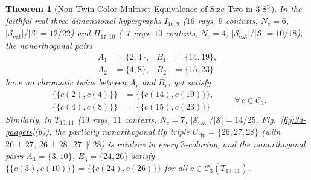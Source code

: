 \documentclass[aps,pra,reprint,superscriptaddress,longbibliography,nofootinbib,floatfix,10pt]{revtex4-2}
\newtheorem{theorem}{Theorem}
\theoremstyle{definition}\newtheorem{definition}[theorem]{Definition}
\theoremstyle{remark}\newtheorem{remark}[theorem]{Remark}
\newcommand{\Sc}{\mathcal S}\newcommand{\Cc}{\mathcal C}\newcommand{\Wc}{\mathcal W}
\begin{document}
\begin{theorem}[Non-Twin Color-Multiset Equivalence of Size Two in $3.8^3$]\label{thm:size2-real}
In the faithful real three-dimensional hypergraphs $I_{16,9}$ ($16$ rays, $9$ contexts, $N_c=6$, $|\Sc_{\mathrm{ext}}|/|\Sc|=12/22$) and $H_{17,10}$ ($17$ rays, $10$ contexts, $N_c=4$, $|\Sc_{\mathrm{ext}}|/|\Sc|=10/18$), the nonorthogonal pairs
\begin{equation}\label{eq:I16-H17-size2}
\begin{aligned}
A_1&=\{2,4\},& B_1&=\{14,19\},\\
A_2&=\{4,8\},& B_2&=\{15,23\}
\end{aligned}
\end{equation}
have no chromatic twins between $A_r$ and $B_r$, yet satisfy
\begin{equation}\label{eq:I16-H17-multiset}
\begin{aligned}
\bigl\{\!\bigl\{c(2),c(4)\bigr\}\!\bigr\} &= \bigl\{\!\bigl\{c(14),c(19)\bigr\}\!\bigr\},\\
\bigl\{\!\bigl\{c(4),c(8)\bigr\}\!\bigr\} &= \bigl\{\!\bigl\{c(15),c(23)\bigr\}\!\bigr\}
\end{aligned}
\qquad \forall\, c\in\Cc_3.
\end{equation}
Similarly, in $T_{19,11}$ ($19$ rays, $11$ contexts, $N_c=7$, $|\Sc_{\mathrm{ext}}|/|\Sc|=14/25$, Fig.~\ref{fig:3d-gadgets}(b)), the partially nonorthogonal tip triple $U_{\mathrm{tip}}=\{26,27,28\}$ (with $26\perp 27$, $26\perp 28$, $27\not\perp 28$) is rainbow in every $3$-coloring, and the nonorthogonal pairs $A_3=\{3,10\}$, $B_3=\{24,26\}$ satisfy $\{\!\{c(3),c(10)\}\!\}=\{\!\{c(24),c(26)\}\!\}$ for all $c\in\Cc_3(T_{19,11})$.
\end{theorem}
\end{document}
